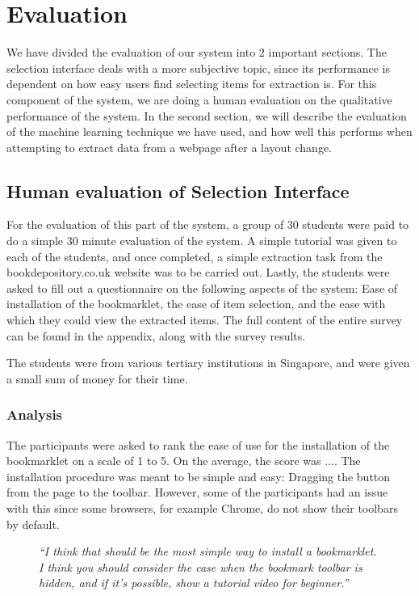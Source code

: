 \chapter{Evaluation}
\label{chap:evaluation}
We have divided the evaluation of our system into 2 important sections. The selection interface
deals with a more subjective topic, since its performance is dependent on how easy users find 
selecting items for extraction is. For this component of the system, we are doing a human
evaluation on the qualitative performance of the system. In the second section, we will describe
the evaluation of the machine learning technique we have used, and how well this performs when
attempting to extract data from a webpage after a layout change.



\section{Human evaluation of Selection Interface}

For the evaluation of this part of the system, a group of 30 students were paid to do a simple 30
minute evaluation of the system. A simple tutorial was given to each of the students, and once
completed, a simple extraction task from the bookdepository.co.uk website was to be carried out.
Lastly, the students were asked to fill out a questionnaire on the following aspects of the
system: Ease of installation of the bookmarklet, the ease of item selection, and the ease with
which they could view the extracted items. The full content of the entire survey can be found in
the appendix, along with the survey results.

The students were from various tertiary institutions in Singapore, and were given a small sum of
money for their time.
\subsection{Analysis}
The participants were asked to rank the ease of use for the installation of the bookmarklet on
a scale of 1 to 5. On the average, the score was .... The installation procedure was meant to
be simple and easy: Dragging the button from the page to the toolbar. However, some of the 
participants had an issue with this since some browsers, for example Chrome, do not show their
toolbars by default.

\begin{figure}
\textit{
``I think that should be the most simple way to install a bookmarklet. 
I think you should consider the case when the bookmark toolbar is hidden,
and if it's possible, show a tutorial video for beginner.''}
\end{figure}

